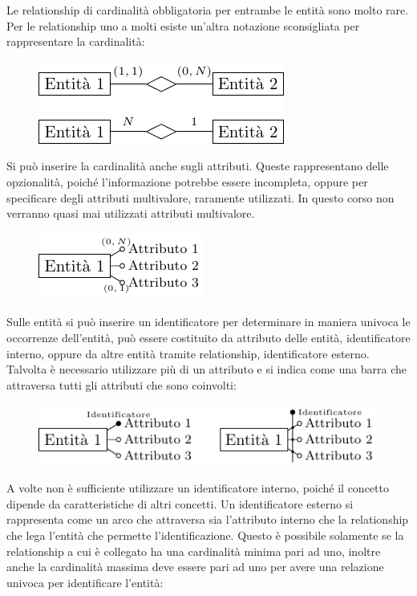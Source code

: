 \documentclass{article}
\numberwithin{equation}{subsection}
\begin{document}
Le relationship di cardinalità obbligatoria per entrambe le entità sono molto rare. 
Per le relationship uno a molti esiste un'altra notazione sconsigliata per rappresentare la cardinalità:

\begin{figure}[H]%
    \centering%
    \includegraphics[scale=1.25]{notazione_uno_molti.pdf}%
\end{figure}

Si può inserire la cardinalità anche sugli attributi. Queste rappresentano delle opzionalità, poiché l'informazione potrebbe essere incompleta, oppure per specificare degli attributi multivalore, 
raramente utilizzati. In questo corso non verranno quasi mai utilizzati attributi multivalore. 
\begin{figure}[H]%
    \centering%
    \includegraphics[scale=1.25]{attributo_cardinalita.pdf}%
\end{figure}

Sulle entità si può inserire un identificatore per determinare in maniera univoca le occorrenze dell'entità, può essere costituito da attributo delle entità, 
identificatore interno, oppure da altre entità tramite relationship, identificatore esterno. Talvolta è necessario utilizzare più di un attributo e si indica come una barra che 
attraversa tutti gli attributi che sono coinvolti: 
\begin{figure}[H]%
    \centering%
    \includegraphics[scale=1.25]{identificatore_interno.pdf}%
\end{figure}

A volte non è sufficiente utilizzare un identificatore interno, poiché il concetto dipende da caratteristiche di altri concetti. Un identificatore esterno si rappresenta 
come un arco che attraversa sia l'attributo interno che la relationship che lega l'entità che permette l'identificazione. 
Questo è possibile solamente se la relationship a cui è collegato ha una cardinalità minima pari ad uno, inoltre anche la cardinalità massima deve essere pari ad uno 
per avere una relazione univoca per identificare l'entità: 
\end{document}
